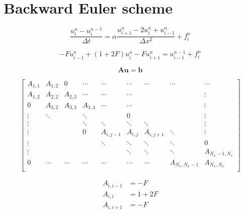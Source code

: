 \documentclass[a4paper,12pt]{article}
\begin{document}
\section{Backward Euler scheme}

\begin{equation}
\frac{u_{i}^{n} - u_{i}^{n-1}}{\Delta t} = \alpha
\frac{u^{n}_{i+1} - 2u^{n}_{i} + u^{n}_{i-1}}{\Delta x^2} + f_{i}^{n}
\end{equation}

\begin{equation}
-Fu_{i-1}^{n} + (1 + 2F)u_{i}^{n} - F u_{i+1}^{n} = u^{n-1}_{i-1} + f^{n}_{i}
\end{equation}

\begin{equation}
\mathbf{A}\mathbf{u} = \mathbf{b}
\end{equation}


\begin{equation}
\begin{bmatrix}
A_{1,1} & A_{1,2} & 0       & \cdots  & \cdots    & \cdots  & \cdots    & \cdots        & \cdots \\
A_{1,2} & A_{2,2} & A_{2,3} & \cdots  & \cdots    & \cdots  &           &               & \vdots \\
0       & A_{3,2} & A_{3,3} & A_{3,4} & \cdots    & \cdots  &           &               & \vdots \\
\vdots  & \ddots  &         & \ddots  &           &  0      &           &               & \vdots \\
\vdots  &         &         & \ddots  & \ddots    & \ddots  & \ddots    &               & \vdots \\
\vdots  &         &         & 0       & A_{i,j-1} & A_{i,j} & A_{i,j+1} & \ddots        & \vdots \\
\vdots  &         &         &         & \ddots    & \ddots  & \ddots    & \ddots        & 0 \\
\vdots  &         &         &         &           & \ddots  & \ddots    & \ddots        & A_{N_x-1,N_x} \\
0       & \cdots  & \cdots  & \cdots  & \cdots    & \cdots  & \cdots    & A_{N_x,N_x-1} & A_{N_x,N_x} \\
\end{bmatrix}
\end{equation}

\begin{align*}
A_{i,i-1} & = -F \\
A_{i,i}   & = 1 + 2F \\
A_{i,i+1} & = -F
\end{align*}
\end{document}
